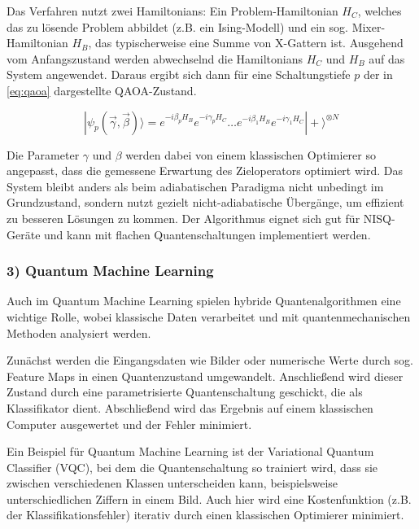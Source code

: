 Das Verfahren nutzt zwei Hamiltonians: Ein Problem-Hamiltonian $H_C$, welches das zu lösende Problem abbildet (z.B. ein Ising-Modell) und ein sog. Mixer-Hamiltonian $H_B$, das typischerweise eine Summe von X-Gattern ist. Ausgehend vom Anfangszustand werden abwechselnd die Hamiltonians $H_C$ und $H_B$ auf das System angewendet. Daraus ergibt sich dann für eine Schaltungstiefe $p$ der in \autoref{eq:qaoa} dargestellte QAOA-Zustand. \autocite[3]{zhou_quantum_nodate}

\begin{equation}
    |\psi_p(\vec{\gamma}, \vec{\beta})\rangle = e^{-i\beta_p H_B}e^{-i\gamma_p H_C} \dots e^{-i\beta_1 H_B}e^{-i\gamma_1 H_C} |+\rangle^{\otimes N}
\label{eq:qaoa}
\end{equation}

Die Parameter $\gamma$ und $\beta$ werden dabei von einem klassischen Optimierer so angepasst, dass die gemessene Erwartung des Zieloperators optimiert wird. Das System bleibt anders als beim adiabatischen Paradigma nicht unbedingt im Grundzustand, sondern nutzt gezielt nicht-adiabatische Übergänge, um effizient zu besseren Lösungen zu kommen. Der Algorithmus eignet sich gut für NISQ-Geräte und kann mit flachen Quantenschaltungen implementiert werden. \autocite[2-9]{zhou_quantum_nodate}

\subsubsection*{3) Quantum Machine Learning}

Auch im Quantum Machine Learning spielen hybride Quantenalgorithmen eine wichtige Rolle, wobei klassische Daten verarbeitet und mit quantenmechanischen Methoden analysiert werden.

Zunächst werden die Eingangsdaten wie Bilder oder numerische Werte durch sog. Feature Maps in einen Quantenzustand umgewandelt. Anschließend wird dieser Zustand durch eine parametrisierte Quantenschaltung geschickt, die als Klassifikator dient. Abschließend wird das Ergebnis auf einem klassischen Computer ausgewertet und der Fehler minimiert.

Ein Beispiel für Quantum Machine Learning ist der Variational Quantum Classifier (VQC), bei dem die Quantenschaltung so trainiert wird, dass sie zwischen verschiedenen Klassen unterscheiden kann, beispielsweise unterschiedlichen Ziffern in einem Bild. Auch hier wird eine Kostenfunktion (z.B. der Klassifikationsfehler) iterativ durch einen klassischen Optimierer minimiert. 

